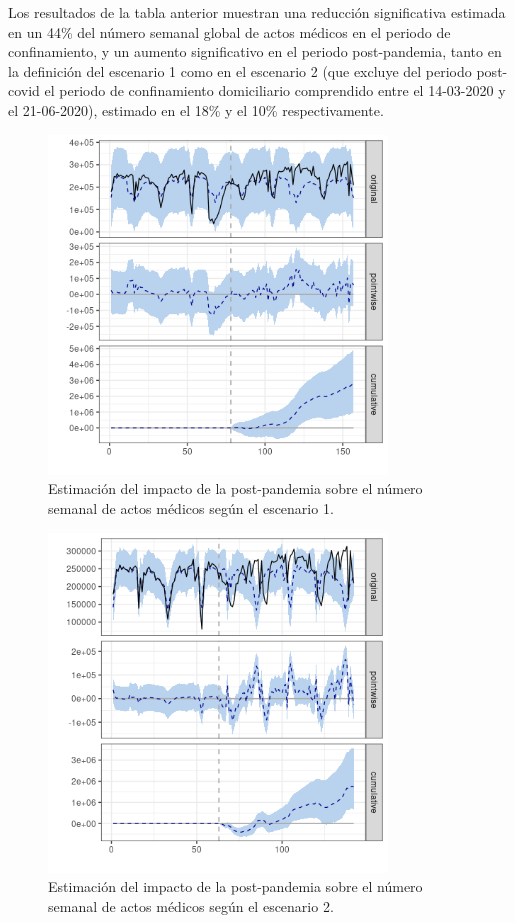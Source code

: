 \documentclass[12pt,twoside]{article} %
\begin{document}
Los resultados de la tabla anterior muestran una reducción significativa estimada en un 44\% del número semanal global de actos médicos en el periodo de confinamiento, y un aumento significativo en el periodo post-pandemia, tanto en la definición del escenario 1 como en el escenario 2 (que excluye del periodo post-covid el periodo de confinamiento domiciliario comprendido entre el 14-03-2020 y el 21-06-2020), estimado en el 18\% y el 10\% respectivamente.
      
  \begin{center}
  \begin{figure}[H]
    \includegraphics[width=9cm]{global_post_scen1.png}\caption{Estimación del impacto de la post-pandemia sobre el número semanal de actos médicos según el escenario 1.}\label{global_postcovid1}
  \end{figure}
  \end{center}
  
  \begin{center}
      \begin{figure}[H]
        \includegraphics[width=9cm]{global_post_scen2.png}\caption{Estimación del impacto de la post-pandemia sobre el número semanal de actos médicos según el escenario 2.}\label{global_postcovid2}
      \end{figure}
      \end{center}
\end{document}
